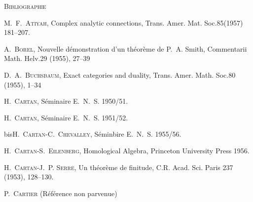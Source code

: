 \clearpage
{}

\begin{center}\normalsize\textsc{Bibliographie}\end{center}

\small
\begin{list}{}{%
  \setlength{\leftmargin}{5.3em}%
  \setlength{\itemindent}{-3em}%
  \setlength{\labelwidth}{1.6em}%
  \setlength{\labelsep}{0.7em}%
  \setlength{\itemsep}{0.28em}%
  \setlength{\parsep}{0pt}%
  \setlength{\topsep}{0.3em}%
}
\item[{[1]}] M.\ F.\ \textsc{Atiyah}, Complex analytic connections,
Trans. Amer. Mat\SourceTurnedH{}. Soc.85(1957) 181--207.

\item[{[2]}] A.\ \textsc{Borel}, Nouvelle démonstration d'un théorème de
P.\ A. Smith, Commentarii Math. Helv.29 (1955), 27--39

\item[{[3]}] D.\ A.\ \textsc{Buchsbaum}, Exact categories and duality,
Trans. Amer. Math. Soc.80 (1955), 1--34

\item[{[4]}] H.\ \textsc{Cartan}, Séminaire E.\ N.\ S. 1950/51.

\item[{[5]}] H.\ \textsc{Cartan}, Séminaire E.\ N.\ S. 1951/52.

\item[{[5]}] bisH.\ \textsc{Cartan-C.\ Chevalley}, Séminbire E.\ N.\ S. 1955/56.

\item[{[6]}] H.\ \textsc{Cartan-S.\ Eilenberg}, Homological Algebra,
Princeton University Press 1956.

\item[{[7]}] H.\ \textsc{Cartan-J.\ P. Serre}, Un théorème de finitude,
C.R. Acad. Sci. Paris 237 (1953), 128--130.

\item[{[8]}] P.\ \textsc{Cartier} (Référence non parvenue)


\end{list}
